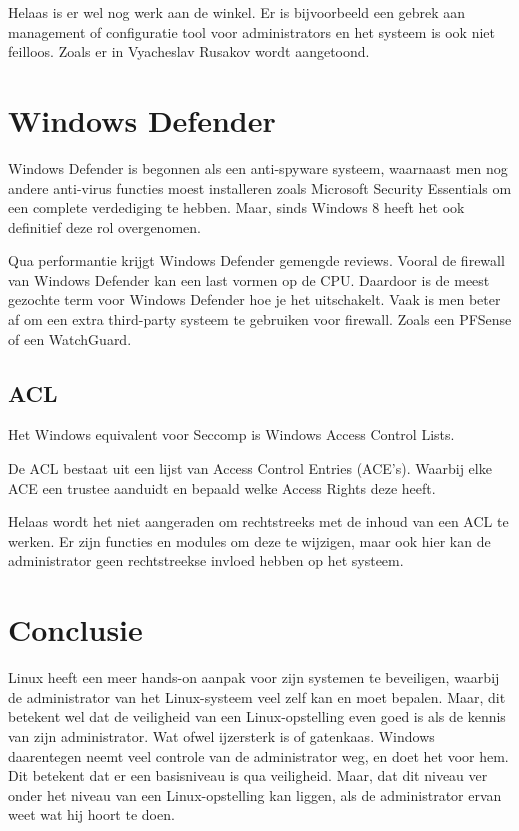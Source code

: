Helaas is er wel nog werk aan de winkel. Er is bijvoorbeeld een gebrek aan management of configuratie tool voor administrators en het systeem is ook niet feilloos. Zoals er in Vyacheslav Rusakov wordt aangetoond.

\section{Windows Defender}
Windows Defender is begonnen als een anti-spyware systeem, waarnaast men nog andere anti-virus functies moest installeren zoals Microsoft Security Essentials om een complete verdediging te hebben. Maar, sinds Windows 8 heeft het ook definitief deze rol overgenomen.

Qua performantie krijgt Windows Defender gemengde reviews. Vooral de firewall van Windows Defender kan een last vormen op de CPU. Daardoor is de meest gezochte term voor Windows Defender hoe je het uitschakelt. Vaak is men beter af om een extra third-party systeem te gebruiken voor firewall. Zoals een PFSense of een WatchGuard.

\subsection{ACL}
Het Windows equivalent voor Seccomp is Windows Access Control Lists.

De ACL bestaat uit een lijst van Access Control Entries (ACE's). Waarbij elke ACE een trustee aanduidt en bepaald welke Access Rights deze heeft.

Helaas wordt het niet aangeraden om rechtstreeks met de inhoud van een ACL te werken. Er zijn functies en modules om deze te wijzigen, maar ook hier kan de administrator geen rechtstreekse invloed hebben op het systeem.

\section{Conclusie}
Linux heeft een meer hands-on aanpak voor zijn systemen te beveiligen, waarbij de administrator van het Linux-systeem veel zelf kan en moet bepalen. Maar, dit betekent wel dat de veiligheid van een Linux-opstelling even goed is als de kennis van zijn administrator. Wat ofwel ijzersterk is of gatenkaas. Windows daarentegen neemt veel controle van de administrator weg, en doet het voor hem. Dit betekent dat er een basisniveau is qua veiligheid. Maar, dat dit niveau ver onder het niveau van een Linux-opstelling kan liggen, als de administrator ervan weet wat hij hoort te doen.